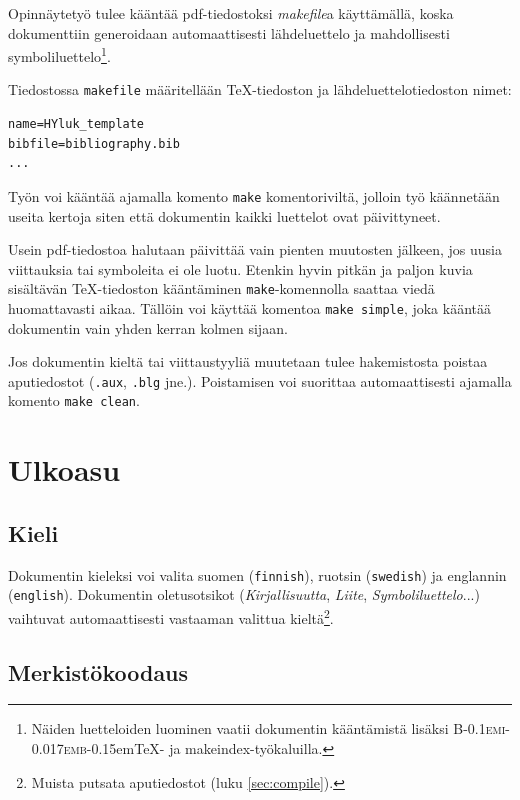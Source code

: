 \documentclass[finnish,twoside,openright]{HYgradu}
\begin{document}
Opinn\"aytety\"o tulee k\"a\"ant\"a\"a pdf-tiedostoksi \emph{makefile}a k\"aytt\"am\"all\"a, koska dokumenttiin generoidaan automaattisesti l\"ahdeluettelo ja mahdollisesti symboliluettelo\footnote{N\"aiden luetteloiden luominen vaatii dokumentin k\"a\"ant\"amist\"a lis\"aksi \textsc{B\kern-0.1emi\kern-0.017emb}\kern-0.15em\TeX- ja makeindex-ty\"okaluilla.}.

Tiedostossa \texttt{makefile} m\"a\"aritell\"a\"an \TeX-tiedoston ja l\"ahdeluettelotiedoston nimet:
\begin{verbatim}
name=HYluk_template
bibfile=bibliography.bib
...
\end{verbatim}
Ty\"on voi k\"a\"ant\"a\"a ajamalla komento \texttt{make} komentorivilt\"a, jolloin ty\"o k\"a\"annet\"a\"an useita kertoja siten ett\"a dokumentin kaikki luettelot ovat p\"aivittyneet.

Usein pdf-tiedostoa halutaan p\"aivitt\"a\"a vain pienten muutosten j\"alkeen, jos uusia viittauksia tai symboleita ei ole luotu. Etenkin hyvin pitk\"an ja paljon kuvia sis\"alt\"av\"an \TeX-tiedoston k\"a\"ant\"aminen \texttt{make}-komennolla saattaa vied\"a huomattavasti aikaa.
T\"all\"oin voi k\"aytt\"a\"a komentoa \texttt{make simple}, joka k\"a\"ant\"a\"a dokumentin vain yhden kerran kolmen sijaan. 

Jos dokumentin kielt\"a tai viittaustyyli\"a muutetaan tulee hakemistosta poistaa aputiedostot (\texttt{.aux}, \texttt{.blg} jne.). Poistamisen voi suorittaa automaattisesti ajamalla komento \texttt{make clean}.

\chapter{Ulkoasu}

\section{Kieli}

Dokumentin kieleksi voi valita suomen (\texttt{finnish}), ruotsin (\texttt{swedish}) ja englannin (\texttt{english}). Dokumentin oletusotsikot (\emph{Kirjallisuutta}, \emph{Liite}, \emph{Symboliluettelo}...) vaihtuvat automaattisesti vastaaman valittua kielt\"a\footnote{Muista putsata aputiedostot (luku \ref{sec:compile}).}. 

\section{Merkist\"okoodaus}
 
\end{document}
